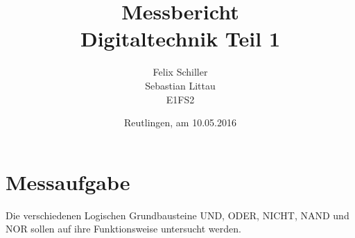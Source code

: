 \documentclass[
a4paper,     %
 headsepline, %
11pt         %
]{scrartcl}  %
\title{Messbericht \\ Digitaltechnik Teil 1}
\author{Felix Schiller \\ Sebastian Littau \\ E1FS2}
\date{Reutlingen, am 10.05.2016}
\begin{document}

\maketitle

\newpage
\tableofcontents





\section{Messaufgabe}
Die verschiedenen Logischen Grundbausteine UND, ODER, NICHT, NAND und NOR sollen auf ihre Funktionsweise untersucht werden.
\end{document}
